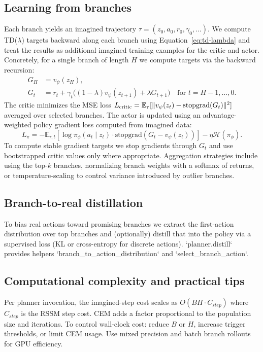 \documentclass{article}
\begin{document}
\subsection{Learning from branches}
Each branch yields an imagined trajectory \(\tau=(z_0,a_0,r_0,\gamma_0,\dots)\).
We compute TD(\(\lambda\)) targets backward along each branch using
Equation~\eqref{eq:td-lambda} and treat the results as additional imagined
training examples for the critic and actor. Concretely, for a single branch of
length \(H\) we compute targets via the backward recursion:
\begin{align}
G_{H} &= v_\psi(z_H),\nonumber \\
G_{t} &= r_t + \gamma_t\big((1-\lambda)v_\psi(z_{t+1}) + \lambda G_{t+1}\big)\quad\text{for }t=H-1,\dots,0.
\end{align}
The critic minimizes the MSE loss
\(L_{\rm critic}=\mathbb{E}_{\tau}[\|v_\psi(z_t)-\mathrm{stopgrad}(G_t)\|^2]\)
averaged over selected branches. The actor is updated using an advantage-weighted
policy gradient loss computed from imagined data:
\begin{equation}
L_\pi = -\mathbb{E}_{\tau, t}[\log\pi_\phi(a_t\mid z_t)\cdot\mathrm{stopgrad}(G_t - v_\psi(z_t))] - \eta\mathcal{H}(\pi_\phi).
\end{equation}
To compute stable gradient targets we stop gradients through \(G_t\) and use
bootstrapped critic values only where appropriate. Aggregation strategies
include using the top-\(k\) branches, normalizing branch weights with a
softmax of returns, or temperature-scaling to control variance introduced by
outlier branches.

\subsection{Branch-to-real distillation}
To bias real actions toward promising branches we extract the first-action
distribution over top branches and (optionally) distill that into the policy
via a supervised loss (KL or cross-entropy for discrete actions). `planner.distill`
provides helpers `branch_to_action_distribution` and `select_branch_action`.

\subsection{Computational complexity and practical tips}
Per planner invocation, the imagined-step cost scales as \(O(BH\cdot C_{step})\)
where \(C_{step}\) is the RSSM step cost. CEM adds a factor proportional to the
population size and iterations. To control wall-clock cost: reduce \(B\) or
\(H\), increase trigger thresholds, or limit CEM usage. Use mixed precision and
batch branch rollouts for GPU efficiency.
\end{document}
